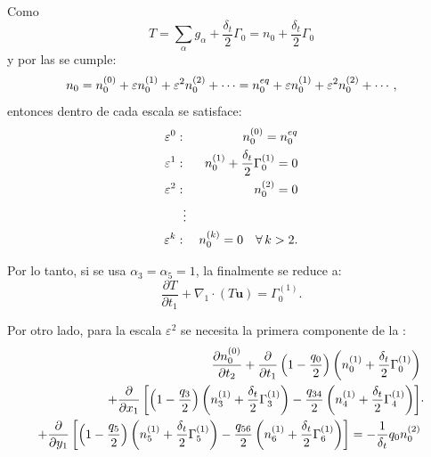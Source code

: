 Como
\begin{equation}
	T = \sum_{\alpha} g_{\alpha} + \dfrac{\delta_t}{2} \Gamma_0 = n_0 + \dfrac{\delta_t}{2} \Gamma_0
\end{equation}
y por las  se cumple:
\begin{equation}
	n_0 = n_{0}^{(0)} + \varepsilon n_{0}^{(1)} + \varepsilon^2 n_{0}^{(2)} + \cdots = n_0^{eq} + \varepsilon n_{0}^{(1)} + \varepsilon^2 n_{0}^{(2)} + \cdots,
\end{equation}
entonces dentro de cada escala se satisface:
\begin{equation}
	\begin{aligned}
		\varepsilon^0: && n_{0}^{(0)} = n_0^{eq} \\
		\varepsilon^1: && n_{0}^{(1)} + \dfrac{\delta_t}{2} \Gamma_0^{(1)} = 0\\
		\varepsilon^2: && n_{0}^{(2)} = 0 \\
		&\vdots& \\
		\varepsilon^k: && n_{0}^{(k)} = 0 \quad \forall \, k > 2.
	\end{aligned}
	\label{eq:ncero_che}
\end{equation}

Por lo tanto, si se usa $\alpha_3 = \alpha_5 = 1$, la  finalmente se reduce a:
\begin{equation}
	\dfrac{\partial T}{\partial t_1} + \nabla_1 \cdot (T\bm{u}) = \Gamma_0^{(1)}.
	\label{eq:T_eps_1_macro}
\end{equation}

Por otro lado, para la escala $\varepsilon^2$ se necesita la primera componente de la :
\begin{equation}
	\begin{split}
	\dfrac{\partial n_{0}^{(0)}}{\partial t_2} + \dfrac{\partial}{\partial t_1}\left( 1-\dfrac{q_0}{2} \right) \left( n_{0}^{(1)} +\dfrac{\delta_t}{2} \Gamma_0^{(1)}\right) \\
	+ \dfrac{\partial}{\partial x_1}\left[ \left( 1-\dfrac{q_3}{2} \right) \left( n_{3}^{(1)} +\dfrac{\delta_t}{2} \Gamma_3^{(1)}\right) - \dfrac{q_{34}}{2} \left( n_{4}^{(1)} +\dfrac{\delta_t}{2} \Gamma_4^{(1)}\right) \right] \\
	+ \dfrac{\partial}{\partial y_1}\left[ \left( 1-\dfrac{q_5}{2} \right) \left( n_{5}^{(1)} +\dfrac{\delta_t}{2} \Gamma_5^{(1)}\right) - \dfrac{q_{56}}{2} \left( n_{6}^{(1)} +\dfrac{\delta_t}{2} \Gamma_6^{(1)}\right) \right] = -\dfrac{1}{\delta_t} q_0 n_{0}^{(2)}
	\end{split}.
	\label{eq:eps_2_comp_0}
\end{equation}

